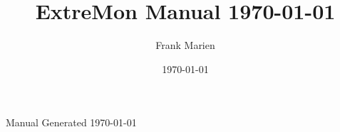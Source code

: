 \title{ExtreMon Manual \ddmmyyyydate \today}
\author{Frank Marien}
\date{\today}

\begin{titlepage}
\begin{center}

\vfill
{\large Manual Generated \ddmmyyyydate \today}

\end{center}
\end{titlepage}
